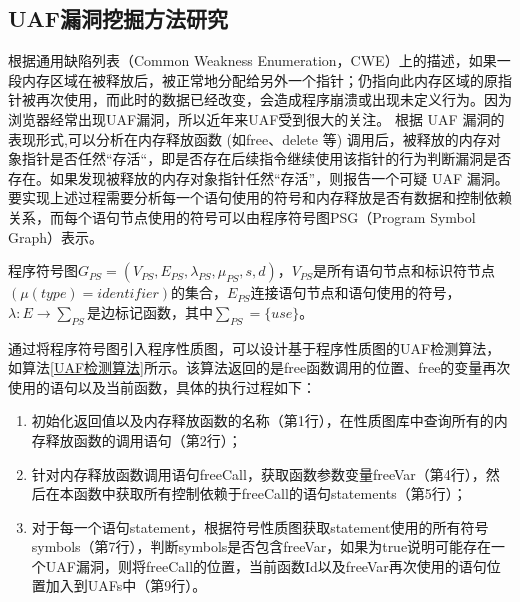 {\subsection{UAF漏洞挖掘方法研究}

根据通用缺陷列表（Common Weakness Enumeration，CWE）上的描述，如果一段内存区域在被释放后，被正常地分配给另外一个指针；仍指向此内存区域的原指针被再次使用，而此时的数据已经改变，会造成程序崩溃或出现未定义行为。因为浏览器经常出现UAF漏洞，所以近年来UAF受到很大的关注。
根据 UAF 漏洞的表现形式,可以分析在内存释放函数 (如free、delete 等) 调用后，被释放的内存对象指针是否任然“存活“，即是否存在后续指令继续使用该指针的行为判断漏洞是否存在。如果发现被释放的内存对象指针任然“存活”，则报告一个可疑 UAF 漏洞。
要实现上述过程需要分析每一个语句使用的符号和内存释放是否有数据和控制依赖关系，而每个语句节点使用的符号可以由程序符号图PSG（Program Symbol Graph）表示。

\begin{definition}
 \label{符号图定义}
 程序符号图$G_{PS}=(V_{PS},E_{PS},\lambda_{PS} ,\mu_{PS}, s,d)$，$V_{PS}$是所有语句节点和标识符节点$(\mu(type) = identifier)$的集合，$E_{PS}$连接语句节点和语句使用的符号，$\lambda : E \rightarrow \sum_{PS}$是边标记函数，其中$\sum_{PS} = \{use\}$。
\end{definition}

通过将程序符号图引入程序性质图，可以设计基于程序性质图的UAF检测算法，如算法\ref{UAF检测算法}所示。该算法返回的是free函数调用的位置、free的变量再次使用的语句以及当前函数，具体的执行过程如下：

\begin{enumerate}[(1)]
\item 初始化返回值以及内存释放函数的名称（第1行），在性质图库中查询所有的内存释放函数的调用语句（第2行）；
\item 针对内存释放函数调用语句freeCall，获取函数参数变量freeVar（第4行），然后在本函数中获取所有控制依赖于freeCall的语句statements（第5行）；
\item 对于每一个语句statement，根据符号性质图获取statement使用的所有符号symbols（第7行），判断symbols是否包含freeVar，如果为true说明可能存在一个UAF漏洞，则将freeCall的位置，当前函数Id以及freeVar再次使用的语句位置加入到UAFs中（第9行）。
\end{enumerate}

}
